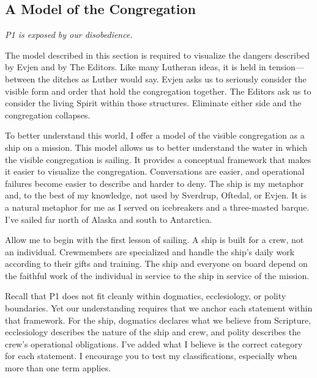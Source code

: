 \pagebreak


\subsection{A Model of the Congregation}

\textit{P1 is exposed by our disobedience.}

The model described in this section is required to visualize the dangers described by Evjen and by The Editors. Like many Lutheran ideas, it is held in tension---between the ditches as Luther would say. Evjen asks us to seriously consider the visible form and order that hold the congregation together. The Editors ask us to consider the living Spirit within those structures. Eliminate either side and the congregation collapses. 
 
To better understand this world, I offer a model of the visible congregation as a ship on a mission. This model allows us to better understand the water in which the visible congregation is sailing. It provides a conceptual framework that makes it easier to visualize the congregation. Conversations are easier, and operational failures become easier to describe and harder to deny. The ship is my metaphor and, to the best of my knowledge, not used by Sverdrup, Oftedal, or Evjen. It is a natural metaphor for me as I served on icebreakers and a three-masted barque. I've sailed far north of Alaska and south to Antarctica. 




Allow me to begin with the first lesson of sailing. A ship is built for a crew, not an individual. Crewmembers are specialized and handle the ship’s daily work according to their gifts and training. The ship and everyone on board depend on the faithful work of the individual in service to the ship in service of the mission. 
     
Recall that P1 does not fit cleanly within dogmatics, ecclesiology, or polity boundaries. Yet our understanding requires that we anchor each statement within that framework. For the ship, dogmatics declares what we believe from Scripture, ecclesiology describes the nature of the ship and crew, and polity describes the crew's operational obligations. I've added what I believe is the correct category for each statement. I encourage you to test my classifications, especially when more than one term applies.  

